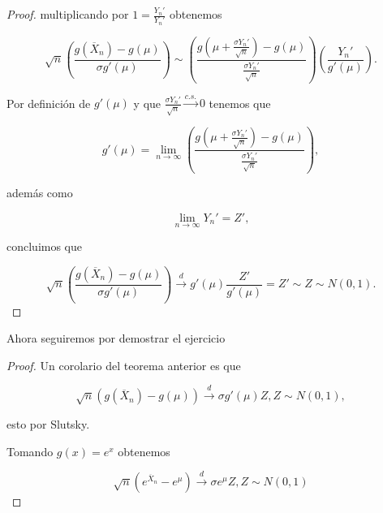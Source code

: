 \documentclass[letterpaper]{article}
\theoremstyle{definition}
\theoremstyle{lemathm}
\theoremstyle{lemathm}
\theoremstyle{lemademthm}
\newcommand{\limninf}{\lim_{n\to\infty}}
\newcommand{\pars}[1]{\left( #1 \right) }
\newcommand{\1}{\mathbbm{1}}
\begin{document}
\begin{enumerate}
\begin{proof}
			multiplicando por $1 = \frac{Y_n'}{Y_n'}$ obtenemos

			\[\sqrt{n} \pars{\frac{g\pars{\overline{X}_n} - g\pars{\mu}}{\sigma g'(\mu)}} \sim \pars{\frac{g\pars{\mu + \frac{\sigma Y_n'}{\sqrt{n}}} - g\pars{\mu}}{\frac{\sigma Y_n'}{\sqrt{n}}}} \pars{\frac{Y_n'}{g'(\mu)}}.\]

			Por definición de $g'(\mu)$ y que $\frac{\sigma Y_n'}{\sqrt{n}} \xrightarrow{c.s.} 0$ tenemos que

			\[g'(\mu) = \limninf \pars{\frac{g\pars{\mu + \frac{\sigma Y_n'}{\sqrt{n}}} - g\pars{\mu}}{\frac{\sigma Y_n'}{\sqrt{n}}}},\]

			además como

			\[\limninf Y_n' = Z',\]

			concluimos que

			\[\sqrt{n} \pars{\frac{g\pars{\overline{X}_n} - g\pars{\mu}}{\sigma g'(\mu)}} \xrightarrow{d} g'(\mu)\frac{Z'}{g'(\mu)} = Z' \sim Z \sim N(0,1).\]

		\end{proof}

		Ahora seguiremos por demostrar el ejercicio

		\begin{proof}
			Un corolario del teorema anterior es que

			\[\sqrt{n} \pars{g\pars{\overline{X}_n} - g\pars{\mu}} \xrightarrow{d} \sigma g'(\mu) Z, Z \sim N(0,1),\]

			esto por Slutsky.

			Tomando $g(x) = e^x$ obtenemos

			\[\sqrt{n} \pars{e^{\overline{X}_n} - e^{\mu}} \xrightarrow{d} \sigma e^\mu Z, Z \sim N(0,1)\]
		\end{proof}

    \end{enumerate}

	
\end{document}
